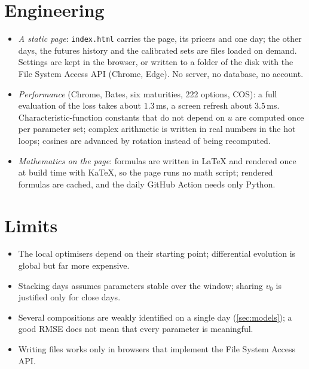 \documentclass[11pt,a4paper]{article}
\theoremstyle{definition}
\theoremstyle{remark}
\begin{document}
\section{Engineering}\label{sec:eng}
\begin{itemize}
  \item \emph{A static page}: \texttt{index.html} carries the page, its pricers and one day; the other days, the futures history
        and the calibrated sets are files loaded on demand. Settings are kept in the browser, or written to a folder of the disk
        with the File System Access API (Chrome, Edge). No server, no database, no account.
  \item \emph{Performance} (Chrome, Bates, six maturities, 222 options, COS): a full evaluation of the loss takes about
        $1.3$\,ms, a screen refresh about $3.5$\,ms. Characteristic-function constants that do not depend on $u$ are computed once
        per parameter set; complex arithmetic is written in real numbers in the hot loops; cosines are advanced by rotation
        instead of being recomputed.
  \item \emph{Mathematics on the page}: formulas are written in LaTeX and rendered once at build time with KaTeX, so the page
        runs no math script; rendered formulas are cached, and the daily GitHub Action needs only Python.
\end{itemize}

\section{Limits}
\begin{itemize}[nosep]
  \item The local optimisers depend on their starting point; differential evolution is global but far more expensive.
  \item Stacking days assumes parameters stable over the window; sharing $v_0$ is justified only for close days.
  \item Several compositions are weakly identified on a single day (\cref{sec:models}); a good RMSE does not mean that every
        parameter is meaningful.
  \item Writing files works only in browsers that implement the File System Access API.
\end{itemize}
\end{document}
